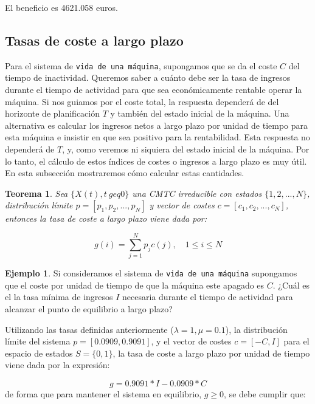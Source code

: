 \documentclass[
]{book}
\newtheorem{theorem}{Teorema}[chapter]
\theoremstyle{definition}
\theoremstyle{definition}
\newtheorem{example}{Ejemplo}[chapter]
\theoremstyle{definition}
\theoremstyle{definition}
\theoremstyle{remark}
\begin{document}
El beneficio es 4621.058 euros.

\hypertarget{tasas-de-coste-a-largo-plazo}{%
\subsection{Tasas de coste a largo plazo}\label{tasas-de-coste-a-largo-plazo}}

Para el sistema de \texttt{vida\ de\ una\ máquina}, supongamos que se da el coste \(C\) del tiempo de inactividad. Queremos saber a cuánto debe ser la tasa de ingresos durante el tiempo de actividad para que sea económicamente rentable operar la máquina. Si nos guiamos por el coste total, la respuesta dependerá de del horizonte de planificación \(T\) y también del estado inicial de la máquina. Una alternativa es calcular los ingresos netos a largo plazo por unidad de tiempo para esta máquina e insistir en que sea positivo para la rentabilidad. Esta respuesta no dependerá de \(T\), y, como veremos ni siquiera del estado inicial de la máquina. Por lo tanto, el cálculo de estos índices de costes o ingresos a largo plazo es muy útil. En esta subsección mostraremos cómo calcular estas cantidades.

\begin{theorem}
Sea \(\{X(t), t \ geq 0\}\) una CMTC irreducible con estados \(\{1, 2,...,N\}\), distribución límite \(p = [p_1, p_2,...,p_N]\) y vector de costes \(c = [c_1, c_2,..., c_N]\), entonces la tasa de coste a largo plazo viene dada por:

\[g(i) = \sum_{j = 1}^N p_jc(j), \quad 1 \leq i \leq N\]
\end{theorem}

\begin{example}
Si consideramos el sistema de \texttt{vida\ de\ una\ máquina} supongamos que el coste por unidad de tiempo de que la máquina este apagado es \(C\). ¿Cuál es el la tasa mínima de ingresos \(I\) necesaria durante el tiempo de actividad para alcanzar el punto de equilibrio a largo plazo?
\end{example}

Utilizando las tasas definidas anteriormente (\(\lambda = 1, \mu = 0.1\)), la distribución límite del sistema \(p = [0.0909, 0.9091]\), y el vector de costes \(c =[-C, I]\) para el espacio de estados \(S = \{0, 1\}\), la tasa de coste a largo plazo por unidad de tiempo viene dada por la expresión:

\[ g = 0.9091*I - 0.0909*C\] de forma que para mantener el sistema en equilibrio, \(g \geq 0\), se debe cumplir que:
\end{document}
